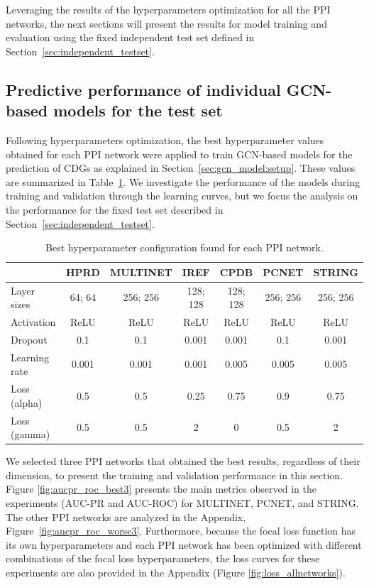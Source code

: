 Leveraging the results of the hyperparameters optimization for all the PPI networks, the next sections will present the results for model training and evaluation using the fixed independent test set defined in Section~\ref{sec:independent_testset}.




\subsection{Predictive performance of individual GCN-based models for the test set}

Following hyperparameters optimization, the best hyperparameter values obtained for each PPI network were applied to train GCN-based models for the prediction of CDGs as explained in Section~\ref{sec:gcn_model:setup}. These values are summarized in Table~\ref{tab:top_hiperparametros}. 
We investigate the performance of the models during training and validation through the learning curves, but we focus the analysis on the performance for the fixed test set described in Section~\ref{sec:independent_testset}.





\begin{table}[!h]
\centering
\caption{Best hyperparameter configuration found for each PPI network. \label{tab:top_hiperparametros}}
\begin{tabular}{lcccccc}
\hline
              & HPRD   & MULTINET & IREF     & CPDB     & PCNET    & STRING   \\ \hline
Layer sizes   & 64; 64 & 256; 256 & 128; 128 & 128; 128 & 256; 256 & 256; 256 \\
Activation    & ReLU   & ReLU     & ReLU     & ReLU     & ReLU     & ReLU     \\
Dropout       & 0.1    & 0.1      & 0.001    & 0.001    & 0.1      & 0.001    \\
Learning rate & 0.001  & 0.001    & 0.001    & 0.005    & 0.005    & 0.005    \\ 
Loss (alpha)  & 0.5    & 0.5      & 0.25     & 0.75     & 0.9      & 0.75     \\
Loss (gamma)  & 0.5    & 0.5      & 2        & 0        & 0.5      & 2        \\
\hline
\end{tabular}
\end{table}



We selected three PPI networks that obtained the best results, regardless of their dimension, to present the training and validation performance in this section. Figure \ref{fig:aucpr_roc_best3} presents the main metrics observed in the experiments (\ie AUC-PR and AUC-ROC) for MULTINET, PCNET, and STRING. The other PPI networks are analyzed in the Appendix, Figure~\ref{fig:aucpr_roc_worse3}. Furthermore, because the focal loss function has its own hyperparameters and each PPI network has been optimized with different combinations of the focal loss hyperparameters, the loss curves for these experiments are also provided in the Appendix (Figure \ref{fig:loss_allnetworks}).


